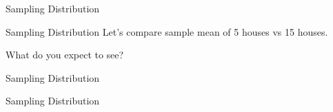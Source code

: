 \documentclass{beamer}\usepackage[]{graphicx}\usepackage[]{color}
\begin{document}
\begin{darkframes}
\begin{frame}[label=lists]{Sampling Distribution}
    	
		
    \end{frame}
    
       
    \begin{frame}[label=lists]{Sampling Distribution}
		Let's compare sample mean of 5 houses vs 15 houses. \newline
		
		What do you expect to see?
	\end{frame}
	
	
	\begin{frame}[label=lists]{Sampling Distribution}
		\begin{figure} 
				\centering
				\setlength\fboxsep{0pt}
				\setlength\fboxrule{0.5pt} 
			\end{figure} 	
	\end{frame}	
	
	
		\begin{frame}[label=lists]{Sampling Distribution}
		\begin{figure} 
				\centering
				\setlength\fboxsep{0pt}
				\setlength\fboxrule{0.5pt} 
			\end{figure} 	
	\end{frame}	
    

\end{darkframes}
\end{document}
